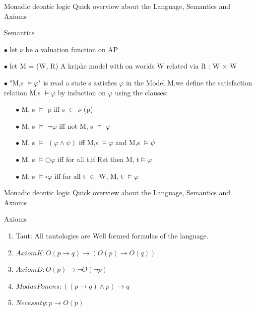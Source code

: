 \documentclass{beamer}
\begin{document}
\begin{frame}{Monadic deontic logic}
Quick overview about the Language, Semantics and Axioms
\begin{block}{Semantics}
\item[$\bullet$ ] let $\nu$ be a valuation function on AP
\item[$\bullet $]  let M = (W, R) A kripke model with on worlds W related via R : W × W
\item[$\bullet $]  "M,s $ \vDash \varphi$" is read a state s satisfies $\varphi$ in the Model M,we define the satisfaction relation M,s $ \vDash \varphi$ by induction on $\varphi$ using the clauses:
\begin{enumerate}
\item[$\bullet$ ]M, s $ \vDash $ p iff s $\in$ $\nu$  (p)
\item[$\bullet$ ]M, s $ \vDash $ $\neg \varphi$ iff not M, s $ \vDash $ $\varphi$
\item[$\bullet$ ]M, s $ \vDash $ $(\varphi\land\psi )$ iff M,s $ \vDash \varphi$ and  M,s $ \vDash \psi$
\item[$\bullet$ ]M, s $ \vDash  \bigcirc\varphi$ iff for all t,if Rst then M, t$\vDash \varphi$
\item[$\bullet$ ]M, s $ \vDash  \square\varphi$ iff for all t $\in$ W, M, t $\vDash \varphi$
\end{enumerate}
\end{block}
\end{frame}
\begin{frame}{Monadic deontic logic}
Quick overview about the Language, Semantics and Axioms
\begin{block}{Axioms}
\begin{enumerate}
\item Taut: All tautologies are Well formed formulas of the language.
\item  $Axiom K: O(p \to q) \to (O(p) \to O(q)) $
\item $ Axiom D: O(p) \to \neg O(\neg p)$
\item $Modus Ponens: ((p \to q) \land p) \to q $
\item $ Necessity: p \to O(p)$
\end{enumerate}
\end{block}
\end{frame}
\end{document}
